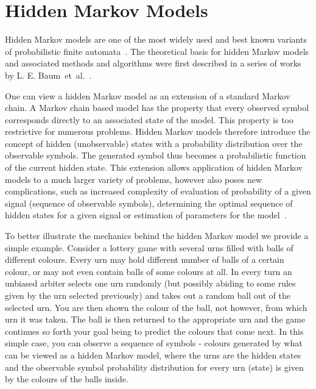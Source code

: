 \documentclass[a4paper,12pt]{article}
\begin{document}
\section{Hidden Markov Models}

Hidden Markov models are one of the most widely used and best known variants of probabilistic finite automata~\cite{pautomacTR, Rabiner89hmm}. The theoretical basis for hidden Markov models and associated methods and algorithms were first described in a series of works by L. E. Baum~et~al.~\cite{baum1966, baum1967, baum1968, baum1970, baum1972}.

One can view a hidden Markov model as an extension of a standard Markov chain. A Markov chain based model has the property that every observed symbol corresponds directly to an associated state of the model. This property is too restrictive for numerous problems. Hidden Markov models therefore introduce the concept of hidden (unobservable) states with a probability distribution over the observable symbols. The generated symbol thus becomes a probabilistic function of the current hidden state. This extension allows application of hidden Markov models to a much larger variety of problems, however also poses new complications, such as increased complexity of evaluation of probability of a given signal (sequence of observable symbols), determining the optimal sequence of hidden states for a given signal or estimation of parameters for the model~\cite{Rabiner89hmm}.

To better illustrate the mechanics behind the hidden Markov model we provide a simple example. Consider a lottery game with several urns filled with balls of different colours. Every urn may hold different number of balls of a certain colour, or may not even contain balls of some colours at all. In every turn an unbiased arbiter selects one urn randomly (but possibly abiding to some rules given by the urn selected previously) and takes out a random ball out of the selected urn. You are then shown the colour of the ball, not however, from which urn it was taken. The ball is then returned to the appropriate urn and the game continues so forth your goal being to predict the colours that come next. In this simple case, you can observe a sequence of symbols - colours generated by what can be viewed as a hidden Markov model, where the urns are the hidden states and the observable symbol probability distribution for every urn (state) is given by the colours of the balls inside.
\end{document}
